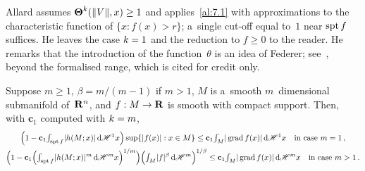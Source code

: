 \begin{remark}
    \label{rem:7.3}
    Allard assumes $\boldsymbol{\Theta}^{k}(\|V\|,x) \ge 1$ and applies~\ref{al:7.1} with approximations
    to the characteristic function of $\{ x : f(x) > r \}$; a~single cut-off equal to~$1$ near $\operatorname{spt}
    f$ suffices. He leaves the case $k = 1$ and the reduction to $f \ge 0$ to the reader.
    He remarks that the introduction of the function~$\theta$ is an idea of Federer;
    see~\cite[4.5.9(18)]{Federer1969}, beyond the formalised range, which is cited for credit only.
\end{remark}

\begin{corollary}
    \label{al:7.4}
    Suppose $m \ge 1$, $\beta = m/(m-1)$ if $m > 1$, $M$ is a~smooth $m$~dimensional submanifold
    of~$\mathbf{R}^{n}$, and $f : M \to \mathbf{R}$ is smooth with compact support. Then, with $\mathbf{c}_1$
    computed with $k = m$,
    \begin{gather*}
        \Big( 1 - \mathbf{c}_1 {\textstyle\int_{\operatorname{spt} f}^{}} |h(M;x)| \,\mathrm{d} \mathscr{H}^1 x \Big) \sup \{ |f(x)| : x \in
        M \} \le \mathbf{c}_1 {\textstyle\int_{M}^{}} |\operatorname{grad} f(x)| \,\mathrm{d} \mathscr{H}^1 x \quad \text{in case $m = 1$} \,,
        \\
        \Big( 1 - \mathbf{c}_1 \Big( {\textstyle\int_{\operatorname{spt} f}^{}} |h(M;x)|^m \,\mathrm{d} \mathscr{H}^m x \Big)^{1/m} \Big)
        \Big( {\textstyle\int_{M}^{}} |f|^\beta \,\mathrm{d} \mathscr{H}^m \Big)^{1/\beta} \le \mathbf{c}_1 {\textstyle\int_{M}^{}} |\operatorname{grad}
        f(x)| \,\mathrm{d} \mathscr{H}^m x \quad \text{in case $m > 1$} \,.
    \end{gather*}
\end{corollary}

